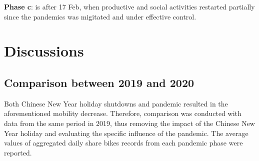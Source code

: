 \documentclass[preprints,ijgi,submit,moreauthors]{Definitions/mdpi}
\begin{document}
\textbf{Phase c}: is after 17 Feb, when productive and social activities restarted partially since the pandemics was migitated and under effective control.


\section{Discussions}
\subsection{Comparison between 2019 and 2020}%

Both Chinese New Year holiday shutdowns and pandemic resulted in the aforementioned mobility decrease.
Therefore, comparison was conducted with data from the same period in 2019, thus removing the impact of the Chinese New Year holiday and evaluating the specific influence of the pandemic.  
The average values of aggregated daily share bikes records from each pandemic phase were reported.
\end{document}
